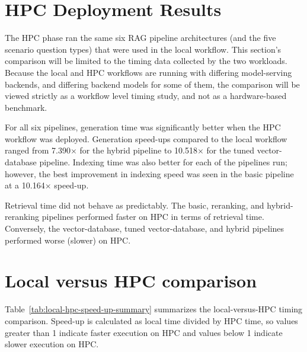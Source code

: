 \section{HPC Deployment Results}

The \ac{HPC} phase ran the same six \ac{RAG} pipeline architectures (and the five scenario question types) that were used in the local workflow. This section's comparison will be limited to the timing data collected by the two workloads. Because the local and \ac{HPC} workflows are running with differing model-serving backends, and differing backend models for some of them, the comparison will be viewed strictly as a workflow level timing study, and not as a hardware-based benchmark.

For all six pipelines, generation time was significantly better when the \ac{HPC} workflow was deployed. Generation speed-ups compared to the local workflow ranged from 7.390$\times$ for the hybrid pipeline to 10.518$\times$ for the tuned vector-database pipeline. Indexing time was also better for each of the pipelines run; however, the best improvement in indexing speed was seen in the basic pipeline at a 10.164$\times$ speed-up.

Retrieval time did not behave as predictably. The basic, reranking, and hybrid-reranking pipelines performed faster on \ac{HPC} in terms of retrieval time. Conversely, the vector-database, tuned vector-database, and hybrid pipelines performed worse (slower) on \ac{HPC}.

\section{Local versus HPC comparison}

Table~\ref{tab:local-hpc-speed-up-summary} summarizes the local-versus-HPC timing comparison. Speed-up is calculated as local time divided by HPC time, so values greater than 1 indicate faster execution on HPC and values below 1 indicate slower execution on HPC.

